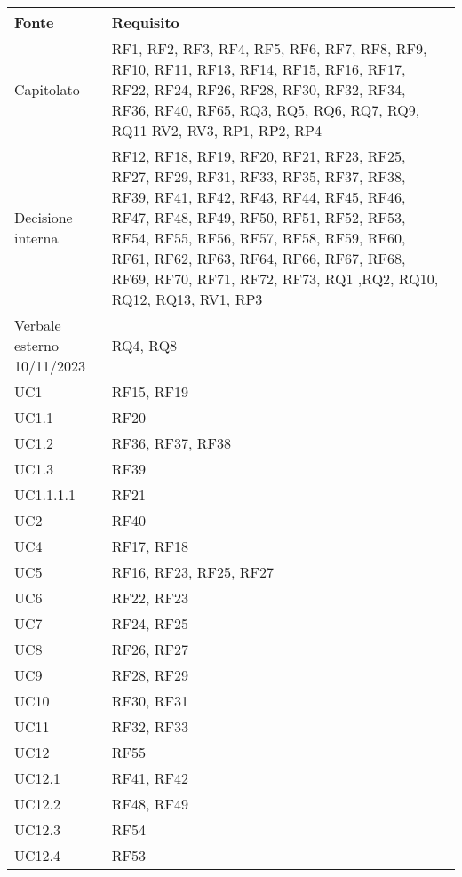\begin{center}
    \begin{longtable}{|C{5cm}|C{5cm}|}
        \hline
        \textbf{Fonte} & \textbf{Requisito} \\
        \hline
        Capitolato & RF1, RF2, RF3, RF4, RF5, RF6, RF7, RF8, RF9, RF10, RF11, RF13, RF14, RF15, RF16, RF17, RF22, RF24, RF26, RF28, RF30, RF32, RF34, RF36, RF40, RF65, RQ3, RQ5, RQ6, RQ7, RQ9, RQ11 RV2, RV3, RP1, RP2, RP4  \\
        \hline
        Decisione interna & RF12, RF18, RF19, RF20, RF21, RF23, RF25, RF27, RF29, RF31, RF33, RF35, RF37, RF38, RF39, RF41, RF42, RF43, RF44, RF45, RF46, RF47, RF48, RF49, RF50, RF51, RF52, RF53, RF54, RF55, RF56, RF57, RF58, RF59, RF60, RF61, RF62, RF63, RF64, RF66, RF67, RF68, RF69, RF70, RF71, RF72, RF73, RQ1 ,RQ2, RQ10, RQ12, RQ13, RV1, RP3 \\
        \hline
        Verbale esterno 10/11/2023 & RQ4, RQ8 \\
        \hline
        UC1 & RF15, RF19 \\
        \hline
        UC1.1 & RF20 \\
        \hline
        UC1.2 & RF36, RF37, RF38 \\
        \hline
        UC1.3 & RF39 \\
        \hline
        UC1.1.1.1 & RF21 \\
        \hline
        UC2 & RF40 \\
        \hline
        UC4 & RF17, RF18 \\
        \hline
        UC5 & RF16, RF23, RF25, RF27 \\
        \hline
        UC6 & RF22, RF23 \\
        \hline
        UC7 & RF24, RF25 \\
        \hline
        UC8 & RF26, RF27 \\
        \hline
        UC9 & RF28, RF29 \\
        \hline
        UC10 & RF30, RF31 \\
        \hline
        UC11 & RF32, RF33 \\
        \hline
        UC12 & RF55 \\
        \hline
        UC12.1 & RF41, RF42 \\
        \hline
        UC12.2 & RF48, RF49 \\
        \hline
        UC12.3 & RF54 \\
        \hline
        UC12.4 & RF53 \\

\end{longtable}
\end{center}
